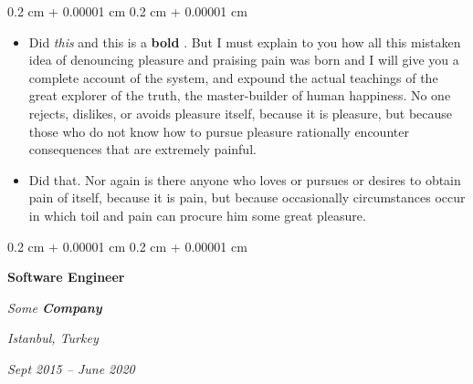 \documentclass[10pt, letterpaper]{article}
\newenvironment{highlights}{
    \begin{itemize}[
        topsep=0.10 cm,
        parsep=0.10 cm,
        partopsep=0pt,
        itemsep=0pt,
        leftmargin=0.4 cm + 10pt
    ]
}{
    \end{itemize}
} %
\newenvironment{onecolentry}{
    \begin{adjustwidth}{
        0.2 cm + 0.00001 cm
    }{
        0.2 cm + 0.00001 cm
    }
}{
    \end{adjustwidth}
} %
\newenvironment{twocolentry}[2][]{
    \onecolentry
    \def\secondColumn{#2}
    \setcolumnwidth{\fill, 4.5 cm}
    \begin{paracol}{2}
}{
    \switchcolumn \raggedleft \secondColumn
    \end{paracol}
    \endonecolentry
} %
\let\hrefWithoutArrow\href
\renewcommand{\href}[2]{\hrefWithoutArrow{#1}{\ifthenelse{\equal{#2}{}}{ }{#2 }\raisebox{.15ex}{\footnotesize \faExternalLink*}}}
\begin{document}
        \vspace{0.10 cm}
        \begin{onecolentry}
            \begin{highlights}
                \item Did \textit{this} and this is a \textbf{bold} \href{https://example.com}{link}. But I must explain to you how all this mistaken idea of denouncing pleasure and praising pain was born and I will give you a complete account of the system, and expound the actual teachings of the great explorer of the truth, the master-builder of human happiness. No one rejects, dislikes, or avoids pleasure itself, because it is pleasure, but because those who do not know how to pursue pleasure rationally encounter consequences that are extremely painful.
                \item Did that. Nor again is there anyone who loves or pursues or desires to obtain pain of itself, because it is pain, but because occasionally circumstances occur in which toil and pain can procure him some great pleasure.
            \end{highlights}
        \end{onecolentry}


        \vspace{0.2 cm}

            \begin{twocolentry}{
        \textit{Istanbul, Turkey}

        \textit{Sept 2015 – June 2020}    }
                \textbf{Software Engineer}

                \textit{Some \textbf{Company}}
            \end{twocolentry}
\end{document}

